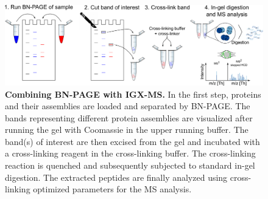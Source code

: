 \begin{figure}[htb]
    \center
    \includegraphics[]{Chapter.2/Figures/Figure1.png}
    \caption{\textbf{Combining BN-PAGE with IGX-MS.} In the first step, proteins and their assemblies are loaded and separated by BN-PAGE. The bands representing different protein assemblies are visualized after running the gel with Coomassie in the upper running buffer. The band(s) of interest are then excised from the gel and incubated with a cross-linking reagent in the cross-linking buffer. The cross-linking reaction is quenched and subsequently subjected to standard in-gel digestion. The extracted peptides are finally analyzed using cross-linking optimized parameters for the MS analysis.}
    \label{fig:ch2_fig1}
\end{figure}

